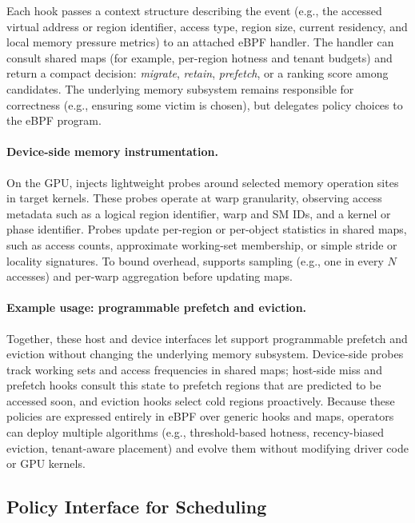 Each hook passes a context structure describing the event (e.g., the accessed
virtual address or region identifier, access type, region size, current residency,
and local memory pressure metrics) to an attached eBPF handler. The handler can
consult shared maps (for example, per-region hotness and tenant budgets) and return
a compact decision: \emph{migrate}, \emph{retain}, \emph{prefetch}, or a ranking
score among candidates. The underlying memory subsystem remains responsible for
correctness (e.g., ensuring some victim is chosen), but delegates policy choices to
the eBPF program.

\paragraph{Device-side memory instrumentation.}
On the GPU, \sys injects lightweight probes around selected memory operation sites
in target kernels. These probes operate at warp granularity, observing access
metadata such as a logical region identifier, warp and SM IDs, and a kernel or
phase identifier. Probes update per-region or per-object statistics in shared maps,
such as access counts, approximate working-set membership, or simple stride or
locality signatures. To bound overhead, \sys supports sampling (e.g., one in every
$N$ accesses) and per-warp aggregation before updating maps.

\paragraph{Example usage: programmable prefetch and eviction.}
Together, these host and device interfaces let \sys support programmable prefetch
and eviction without changing the underlying memory subsystem. Device-side probes
track working sets and access frequencies in shared maps; host-side miss and
prefetch hooks consult this state to prefetch regions that are predicted to be
accessed soon, and eviction hooks select cold regions proactively. Because these
policies are expressed entirely in eBPF over generic hooks and maps, operators can
deploy multiple algorithms (e.g., threshold-based hotness, recency-biased eviction,
tenant-aware placement) and evolve them without modifying driver code or GPU
kernels.

\subsection{Policy Interface for Scheduling}
\label{sec:design-sched}

